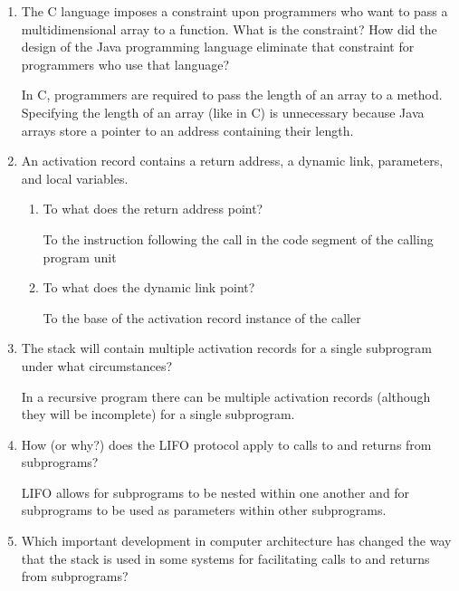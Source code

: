 \begin{enumerate}
  \item The C language imposes a constraint upon programmers
    who want to pass a multidimensional array to a function.
    What is the constraint? How did the design of the Java
    programming language eliminate that constraint for
    programmers who use that language?

    	\begin{answer}
 In C, programmers are required to pass the length of an array to a method. Specifying the length of an array (like in C) is unnecessary because Java arrays store a pointer to an address containing their length.
        \end{answer}

  \item An activation record contains a return
    address, a dynamic link, parameters, and
    local variables.
  \begin{enumerate}
    \item To what does the return address point?
	\begin{answer}
 To the instruction following the call in the code segment of the calling program unit
	\end{answer}
    \item To what does the dynamic link point? 
	\begin{answer}
To the base of the activation record instance of the caller
	\end{answer}   
 \end{enumerate}

  \item The stack will contain multiple activation
    records for a single subprogram under what
    circumstances?

	\begin{answer}
In a recursive program there can be multiple activation records (although they will be incomplete) for a single subprogram.
	\end{answer}

  \item How (or why?) does the LIFO protocol apply to
    calls to and returns from subprograms?

	\begin{answer}
LIFO allows for subprograms to be nested within one another and for subprograms to be used as parameters within other subprograms.
	\end{answer}

  \item Which important development in computer architecture
    has changed the way that the stack is used in some
    systems for facilitating calls to and returns from
    subprograms?


\end{enumerate}
